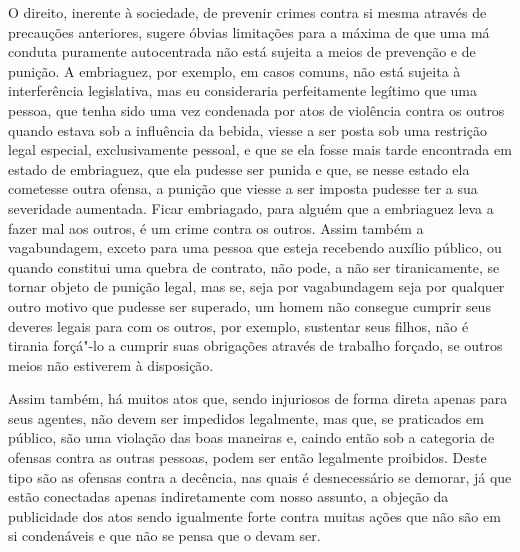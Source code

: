 O direito, inerente à sociedade, de prevenir crimes contra si mesma
através de precauções anteriores, sugere óbvias limitações para a máxima
de que uma má conduta puramente autocentrada não está sujeita a
meios de prevenção e de punição. A embriaguez, por exemplo, em casos
comuns, não está sujeita à interferência legislativa, mas eu
consideraria perfeitamente legítimo que uma pessoa, que tenha sido uma
vez condenada por atos de violência contra os outros quando estava sob
a influência da bebida, viesse a ser posta sob uma restrição legal
especial, exclusivamente pessoal, e que se ela fosse mais tarde
encontrada em estado de embriaguez, que ela pudesse ser punida e que,
se nesse estado ela cometesse outra ofensa, a punição que viesse a ser
imposta pudesse ter a sua severidade aumentada. Ficar embriagado,
para alguém que a embriaguez leva a fazer mal aos outros, é um crime
contra os outros. Assim também a vagabundagem, exceto para uma pessoa
que esteja recebendo auxílio público, ou quando constitui uma quebra de
contrato, não pode, a não ser tiranicamente, se tornar objeto de
punição legal, mas se, seja por vagabundagem seja por qualquer outro
motivo que pudesse ser superado, um homem não consegue cumprir seus
deveres legais para com os outros, por exemplo, sustentar seus filhos,
não é tirania forçá"-lo a cumprir suas obrigações através de trabalho
forçado, se outros meios não estiverem à disposição. 

Assim também, há muitos atos que, sendo injuriosos de forma direta
apenas para seus agentes, não devem ser impedidos legalmente, mas que,
se praticados em público, são uma violação das boas maneiras e, caindo
então sob a categoria de ofensas contra as outras pessoas, podem ser
então legalmente proibidos. Deste tipo são as ofensas contra a
decência, nas quais é desnecessário se demorar, já que estão
conectadas apenas indiretamente com nosso assunto, a objeção da
publicidade dos atos sendo igualmente forte contra muitas ações que
não são em si condenáveis e que não se pensa que o devam ser. 

